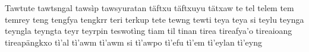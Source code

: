 \documentclass[a4paper]{article}
\begin{document}
Tawtute\hspace{2mm}
tawtsngal\hspace{2mm}
tawsìp\hspace{2mm}
tawsyuratan\hspace{2mm}
täftxu\hspace{2mm}
täftxuyu\hspace{2mm}
tätxaw\hspace{2mm}
te\hspace{2mm}
tel\hspace{2mm}
telem\hspace{2mm}
tem\hspace{2mm}
temrey\hspace{2mm}
teng\hspace{2mm}
tengfya\hspace{2mm}
tengkrr\hspace{2mm}
teri\hspace{2mm}
terkup\hspace{2mm}
tete\hspace{2mm}
tewng\hspace{2mm}
tewti\hspace{2mm}
teya\hspace{2mm}
teya si\hspace{2mm}
teylu\hspace{2mm}
teynga\hspace{2mm}
teyngla\hspace{2mm}
teyngta\hspace{2mm}
teyr\hspace{2mm}
teyrpin\hspace{2mm}
teswotìng\hspace{2mm}
tiam\hspace{2mm}
til\hspace{2mm}
tinan\hspace{2mm}
tirea\hspace{2mm}
tireafya'o\hspace{2mm}
tireaioang\hspace{2mm}
tireapängkxo\hspace{2mm}
tì'al\hspace{2mm}
tì'awm\hspace{2mm}
tì'awm si\hspace{2mm}
tì'awpo\hspace{2mm}
tì'efu\hspace{2mm}
tì'em\hspace{2mm}
tì'eylan\hspace{2mm}
tì'eyng\hspace{2mm}
\end{document}

